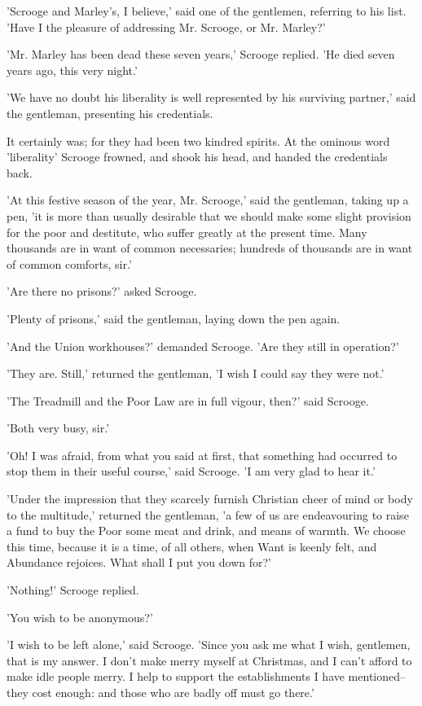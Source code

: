 'Scrooge and Marley's, I believe,' said one of the gentlemen, referring
to his list. 'Have I the pleasure of addressing Mr. Scrooge, or Mr.
Marley?'

'Mr. Marley has been dead these seven years,' Scrooge replied. 'He died
seven years ago, this very night.'

'We have no doubt his liberality is well represented by his surviving
partner,' said the gentleman, presenting his credentials.

It certainly was; for they had been two kindred spirits. At the ominous
word 'liberality' Scrooge frowned, and shook his head, and handed the
credentials back.

'At this festive season of the year, Mr. Scrooge,' said the gentleman,
taking up a pen, 'it is more than usually desirable that we should make
some slight provision for the poor and destitute, who suffer greatly at
the present time. Many thousands are in want of common necessaries;
hundreds of thousands are in want of common comforts, sir.'

'Are there no prisons?' asked Scrooge.

'Plenty of prisons,' said the gentleman, laying down the pen again.

'And the Union workhouses?' demanded Scrooge. 'Are they still in
operation?'

'They are. Still,' returned the gentleman, 'I wish I could say they were
not.'

'The Treadmill and the Poor Law are in full vigour, then?' said Scrooge.

'Both very busy, sir.'

'Oh! I was afraid, from what you said at first, that something had
occurred to stop them in their useful course,' said Scrooge. 'I am very
glad to hear it.'

'Under the impression that they scarcely furnish Christian cheer of mind
or body to the multitude,' returned the gentleman, 'a few of us are
endeavouring to raise a fund to buy the Poor some meat and drink, and
means of warmth. We choose this time, because it is a time, of all
others, when Want is keenly felt, and Abundance rejoices. What shall I
put you down for?'

'Nothing!' Scrooge replied.

'You wish to be anonymous?'

'I wish to be left alone,' said Scrooge. 'Since you ask me what I wish,
gentlemen, that is my answer. I don't make merry myself at Christmas,
and I can't afford to make idle people merry. I help to support the
establishments I have mentioned--they cost enough: and those who are
badly off must go there.'

